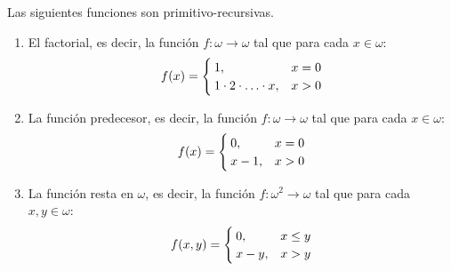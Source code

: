 \begin{theorem}
	\label{theo: funciones_primitivas_basicas} %
	Las siguientes funciones son primitivo-recursivas.

	\begin{enumerate}
		\item El factorial, es decir, la función $f:\omega\to\omega$ tal que para cada $x\in\omega$:
		\[
			f\pa*{x} =
			\begin{cases}
				1, & x = 0\\
				1\cdot2\cdot\dotsc\cdot x, & x > 0
			\end{cases}
		\]
		\item La función predecesor, es decir, la función $f:\omega\to\omega$ tal que para cada $x\in\omega$:
		\[
			f\pa*{x} =
			\begin{cases}
				0, & x = 0\\
				x - 1, & x > 0
			\end{cases}
		\]
		\item La función resta en $\omega$, es decir, la función $f:\omega^{2}\to\omega$ tal que para cada $x, y\in\omega$:
		\[
			f\pa*{x, y} =
			\begin{cases}
				0, & x\leq y\\
				x - y, & x > y
			\end{cases}
		\]
	\end{enumerate}
\end{theorem}

